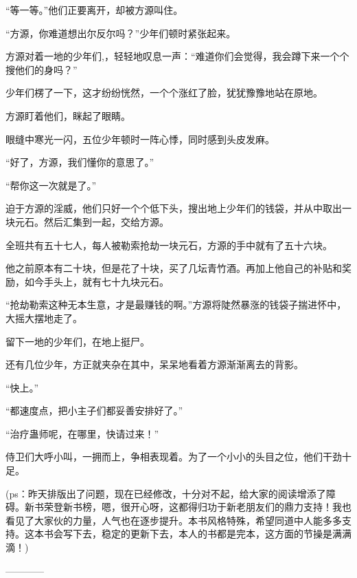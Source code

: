 \begin{this_body}
“等一等。”他们正要离开，却被方源叫住。

“方源，你难道想出尔反尔吗？”少年们顿时紧张起来。

方源对着一地的少年们,，轻轻地叹息一声：“难道你们会觉得，我会蹲下来一个个搜他们的身吗？”

少年们楞了一下，这才纷纷恍然，一个个涨红了脸，犹犹豫豫地站在原地。

方源盯着他们，眯起了眼睛。

眼缝中寒光一闪，五位少年顿时一阵心悸，同时感到头皮发麻。

“好了，方源，我们懂你的意思了。”

“帮你这一次就是了。”

迫于方源的淫威，他们只好一个个低下头，搜出地上少年们的钱袋，并从中取出一块元石。然后汇集到一起，交给方源。

全班共有五十七人，每人被勒索抢劫一块元石，方源的手中就有了五十六块。

他之前原本有二十块，但是花了十块，买了几坛青竹酒。再加上他自己的补贴和奖励，如今手头上，就有七十九块元石。

“抢劫勒索这种无本生意，才是最赚钱的啊。”方源将陡然暴涨的钱袋子揣进怀中，大摇大摆地走了。

留下一地的少年们，在地上挺尸。

还有几位少年，方正就夹杂在其中，呆呆地看着方源渐渐离去的背影。

“快上。”

“都速度点，把小主子们都妥善安排好了。”

“治疗蛊师呢，在哪里，快请过来！”

侍卫们大呼小叫，一拥而上，争相表现着。为了一个小小的头目之位，他们干劲十足。

(ps：昨天排版出了问题，现在已经修改，十分对不起，给大家的阅读增添了障碍。新书荣登新书榜，嗯，很开心呀，这都得归功于新老朋友们的鼎力支持！我也看见了大家伙的力量，人气也在逐步提升。本书风格特殊，希望同道中人能多多支持。这本书会写下去，稳定的更新下去，本人的书都是完本，这方面的节操是满满滴！)

------------

\end{this_body}

